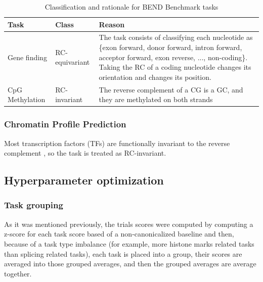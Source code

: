 \documentclass[   ]{article}
\begin{document}
\begin{table}[H]
	\centering
	\caption{Classification and rationale for BEND Benchmark tasks}
	\label{tab:bend_benchmark}
	
	\begin{tabularx}{\linewidth}{p{3cm} p{3cm} X}
		\toprule
		Task & Class & Reason \\
		\midrule
		
		Gene finding & RC-equivariant & The task consists of classifying each nucleotide as \{exon forward, donor forward, intron forward, acceptor forward, exon reverse, ..., non-coding\}. Taking the RC of a coding nucleotide changes its orientation and changes its position. \\
		
		\midrule
		
		CpG Methylation & RC-invariant & The reverse complement of a CG is a GC, and they are methylated on both strands \cite{birdUseRestrictionEnzymes1978} \\
		
		\bottomrule
	\end{tabularx}
\end{table}

\subsubsection{Chromatin Profile Prediction}

Most transcription factors (TFs) are functionally invariant to the
reverse complement \citep{yanDecouplingDivergentGene2015}, so the task
is treated as RC-invariant. 

\subsection{Hyperparameter optimization}

\subsubsection{Task grouping}
\label{sec:hpo_task_grouping}

As it was mentioned previously, the trials scores were computed by computing a z-score for each task score based of a non-canonicalized baseline and then, because of a task type imbalance (for example, more histone marks related tasks than splicing related tasks), each task is placed into a group, their scores are averaged into those grouped averages, and then the grouped averages are average together.
\end{document}
